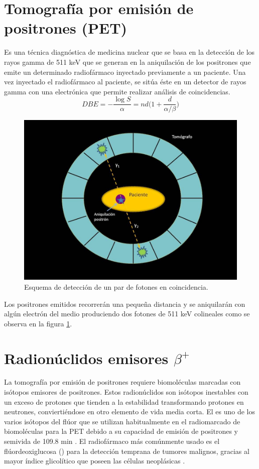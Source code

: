 \documentclass[12pt,a4paper,onecolumn]{article}
\begin{document}
\section{Tomografía por emisión de positrones (PET)}
Es una técnica diagnóstica de medicina  nuclear que se basa en la detección de los rayos gamma de 511 keV que se generan en la aniquilación de los positrones que emite un determinado radiofármaco inyectado previamente a un paciente. Una vez inyectado el radiofármaco al paciente, se sitúa éste en un detector de rayos gamma con una electrónica que permite realizar análisis de coincidencias.
\begin{equation}
DBE=-\frac{\log S}{\alpha}=nd\Big(1+\frac{d}{\alpha/\beta}\Big)
\end{equation}
\begin{figure}[h]
	\centering
	\includegraphics[width=0.5\linewidth]{aniquila}
	\caption{Esquema de detección de un par de fotones en coincidencia.}
	\label{fig:aniquila}
\end{figure}

Los positrones  emitidos recorrerán una pequeña distancia y se aniquilarán con algún electrón del medio produciendo dos fotones de 511 keV colineales como se observa en la figura \ref{fig:aniquila}.
\section{Radionúclidos emisores $\beta^+$}
La tomografía por emisión de positrones requiere biomoléculas marcadas con isótopos emisores de positrones. Estos radionúclidos son isótopos inestables con un exceso de protones que tienden a la estabilidad transformando protones en neutrones, conviertiéndose en otro elemento de vida media corta. El  es uno de los varios isótopos del flúor que se utilizan habitualmente en el radiomarcado de biomoléculas para la PET debido a su capacidad de emisión de positrones y semivida de 109.8 min \cite{alauddin2012}. El radiofármaco más comúnmente usado es el flúordeoxiglucosa () para la detección temprana de tumores malignos, gracias al mayor índice glicolítico que poseen las células neoplásicas \cite{carranza2005}.
\end{document}
